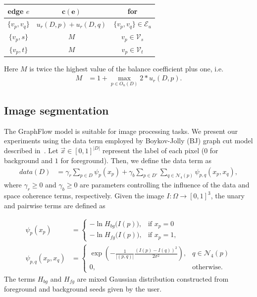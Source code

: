 \documentclass[runningheads]{llncs}
\newcommand{\daniel}[1]{ {\color{black}#1} }
\begin{document}
\begin{center}
\begin{tabular}{|c|c|c|}
\hline
\textbf{edge} $e$ & $\mathbf{c(e)}$ & \textbf{for}\\
\hline
$\{v_p, v_q\}$ & $ u_r(D,p) + u_r(D,q) $ & $\{v_p,v_q\} \in \mathcal{E}_{u}$\\
\hline
$\{v_p, s\}$ & $M$ & $v_p \in \mathcal{V}_{s}$ \\
\hline
$\{v_p, t\}$ & $M$ & $v_p \in \mathcal{V}_{t}$ \\
\hline
\end{tabular}
\end{center}


Here $M$ is twice the highest value of the balance coefficient plus one, i.e.
\begin{align*}
	M &= 1+\max_{p \in O_n(D)} 2*u_r(D,p).
\end{align*}
%

\daniel{\subsection{Image segmentation}
The GraphFlow model is suitable for image processing tasks. We present our experiments using the data term employed by Boykov-Jolly (BJ) graph cut model described in~\cite{boykov01graphcut}. Let $\vec{x} \in [0,1]^{|D|}$ represent the label of each pixel ($0$ for background and $1$ for foreground). Then, we define the data term as
%
\begin{align*}
	data(D) &= \gamma_r \sum_{p \in D}{ \psi_p(x_p) } + \gamma_b \sum_{p \in D'}\sum_{q \in \mathcal{N}_{4}(p)}{\psi_{p,q}(x_p,x_q)},
\end{align*}
where $\gamma_r \geq 0$ and $\gamma_b \geq 0$ are parameters controlling the influence of the data and space coherence terms, respectively. Given the image $I:\Omega \rightarrow [0,1]^3$, the unary and pairwise terms are defined as}
\begin{align*}
	\psi_p(x_p) &= \left\{ \begin{array}{ll}
	-\ln  H_{bg}\big( I(p) \big), & \text{if } x_p=0  \\[1em]	
	-\ln  H_{fg}\big( I(p) \big), & \text{if } x_p=1,
	\end{array}\right.\\[1em]
	\psi_{p,q}(x_p,x_q) &= \left\{ \begin{array}{ll}
	\displaystyle \exp{ \left(- \frac{1}{ |(p,q)| }\frac{(I(p) - I(q))^2}{2\sigma^2} \right) }, & q \in \mathcal{N}_4(p) \\[1em]
	0, & \text{otherwise}.
	\end{array}\right.
\end{align*}
%
\daniel{The terms $H_{bg}$ and $H_{fg}$ are mixed Gaussian distribution constructed from foreground and background seeds given by the user. }
%
%
\end{document}
